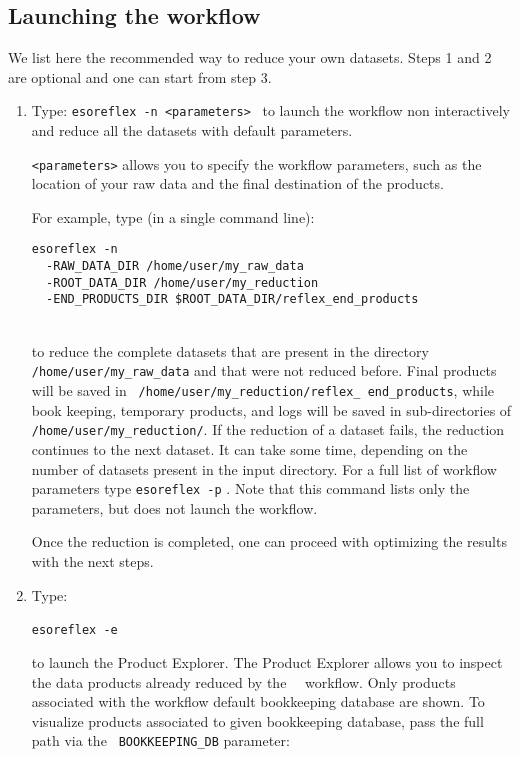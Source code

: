 \subsection{Launching the workflow}\label{sec:setup}

We list here the recommended way to reduce your own datasets. Steps 1
and 2 are optional and one can start from step 3.

\begin{enumerate}

\item Type: {\tt esoreflex -n <parameters>} \wkfname\ to launch the
  workflow non interactively and reduce all the datasets with default
  parameters.

  {\tt <parameters>} allows you to specify the workflow parameters,
  such as the location of your raw data and the final destination of
  the products.

  For example, type (in a single command line):

{\tt esoreflex -n \\
\indent ~ -RAW\_DATA\_DIR /home/user/my\_raw\_data \\
\indent ~ -ROOT\_DATA\_DIR /home/user/my\_reduction \\
\indent ~ -END\_PRODUCTS\_DIR \$ROOT\_DATA\_DIR/reflex\_end\_products \\
\indent ~ }\wkfn\

to reduce the complete datasets that are present in the directory {\tt
  /home/user/my\_raw\_data} and that were not reduced before. Final
products will be saved in  {\tt
  /home/user/my\_reduction/reflex\_ end\_products}, while book keeping,
temporary products, and logs will be saved in sub-directories of {\tt
  /home/user/my\_reduction/}. If the reduction of a dataset fails, the
reduction continues to the next dataset. It can take some time,
depending on the number of datasets present in the input directory.
For a full list of workflow parameters type {\tt esoreflex -p}
\wkfname. Note that this command lists only the parameters, but does not
launch the workflow.

Once the reduction is completed, one can proceed with optimizing the
results with the next steps.


\item Type:

{\tt esoreflex -e} \wkfn\

to launch the Product Explorer. The Product Explorer allows you to
inspect the data products already reduced by the \wkfname\ \
workflow. Only products associated with the workflow default
bookkeeping database are shown. To visualize products associated to
given bookkeeping database, pass the full path via the {\tt
  BOOKKEEPING\_DB} parameter:



\end{enumerate}
